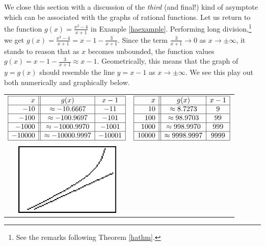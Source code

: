 We close this section with a discussion of the \textit{third} (and final!) kind of asymptote which can be associated with the graphs of rational functions. Let us return to the function $g(x) = \frac{x^2-4}{x+1}$ in Example \ref{haexample}. Performing long division,\footnote{See the remarks following Theorem \ref{hathm}.} we get $g(x) = \frac{x^2-4}{x+1} = x-1 - \frac{3}{x+1}$.  Since the term $\frac{3}{x+1} \rightarrow 0$ as $x \rightarrow \pm \infty$, it stands to reason that as $x$ becomes unbounded, the function values   $g(x) = x-1 - \frac{3}{x+1} \approx x-1$.  Geometrically, this means that the graph of $y=g(x)$ should resemble the line $y = x-1$ as $x \rightarrow \pm \infty$.  We see this play out both numerically and graphically below.

\begin{center}
\begin{tabular}{cc}

$\begin{array}{|r||c|c|}  \hline

  x & g(x) & x-1 \\ \hline
 -10 & \approx -10.6667 & -11 \\  \hline
 -100 & \approx -100.9697 & -101 \\  \hline 
 -1000 &  \approx -1000.9970&   -1001 \\ \hline 
  -10000 &  \approx -10000.9997 &  -10001 \\ \hline 
  \end{array} $ & \hspace{0.75in}

$\begin{array}{|r||c|c|}  \hline

  x & g(x) & x-1 \\ \hline
 10 & \approx 8.7273 &    9 \\\hline
 100 & \approx 98.9703 &   99 \\ \hline 
 1000 &  \approx 998.9970 &  999 \\ \hline 
  10000 &  \approx 9998.9997 &   9999 \\ \hline 
  \end{array} $ \\ 
  
  & \\
  
  \includegraphics[width=2in]{./RationalsGraphics/SA01.jpg} & \hspace{0.75in}
  

\end{tabular}
\end{center}
